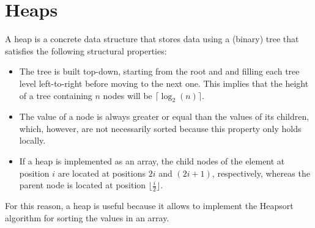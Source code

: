\documentclass{report}
\begin{document}
\section{Heaps}
A heap is a concrete data structure that stores data using a (binary) tree that satisfies the following structural properties:
\begin{itemize}
    \item The tree is built top-down, starting from the root and and filling each tree level left-to-right before moving to the next one. \newline
    This implies that the height of a tree containing $\displaystyle n$ nodes will be $\displaystyle \lceil\log_2(n)\rceil$.
    \item The value of a node is always greater or equal than the values of its children, which, however, are not necessarily sorted because this property only holds locally.
    \item If a heap is implemented as an array, the child nodes of the element at position $\displaystyle i$ are located at positions $\displaystyle 2i$ and $\displaystyle (2i + 1)$, respectively, whereas the parent node is located at position $\displaystyle \bigg\lfloor\frac{i}{2}\bigg\rfloor$.
\end{itemize}
For this reason, a heap is useful because it allows to implement the Heapsort algorithm for sorting the values in an array.
\end{document}

